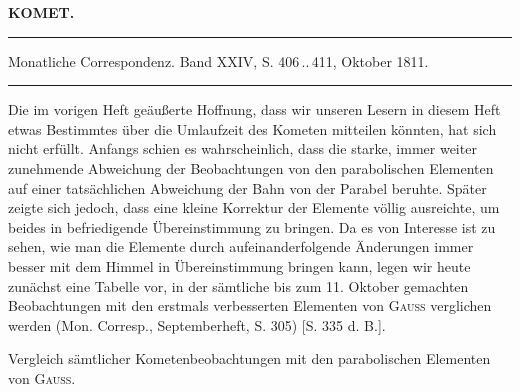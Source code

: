 \clearpage{}\hypertarget{native-343-lower}{}\label{native-343-lower}
\begin{center}\textbf{KOMET.}\par\vspace{4pt}\hrule\vspace{4pt}\fontsize{10}{12}\selectfont Monatliche Correspondenz. Band XXIV, S. 406\,..\,411, Oktober 1811.\par\vspace{4pt}\hrule\vspace{4pt}\end{center}

\par\indent Die im vorigen Heft geäußerte Hoffnung, dass wir unseren Lesern in diesem Heft etwas Bestimmtes über die Umlaufzeit des Kometen mitteilen könnten, hat sich nicht erfüllt. Anfangs schien es wahrscheinlich, dass die starke, immer weiter zunehmende Abweichung der Beobachtungen von den parabolischen Elementen auf einer tatsächlichen Abweichung der Bahn von der Parabel beruhte. Später zeigte sich jedoch, dass eine kleine Korrektur der Elemente völlig ausreichte, um beides in befriedigende Übereinstimmung zu bringen. Da es von Interesse ist zu sehen, wie man die Elemente durch aufeinanderfolgende Änderungen immer besser mit dem Himmel in Übereinstimmung bringen kann, legen wir heute zunächst eine Tabelle vor, in der sämtliche bis zum 11. Oktober gemachten Beobachtungen mit den erstmals verbesserten Elementen von \textsc{Gauß} verglichen werden (Mon. Corresp., Septemberheft, S. 305) [S. 335 d. B.].

Vergleich sämtlicher Kometenbeobachtungen mit den parabolischen Elementen von \textsc{Gauß}.

